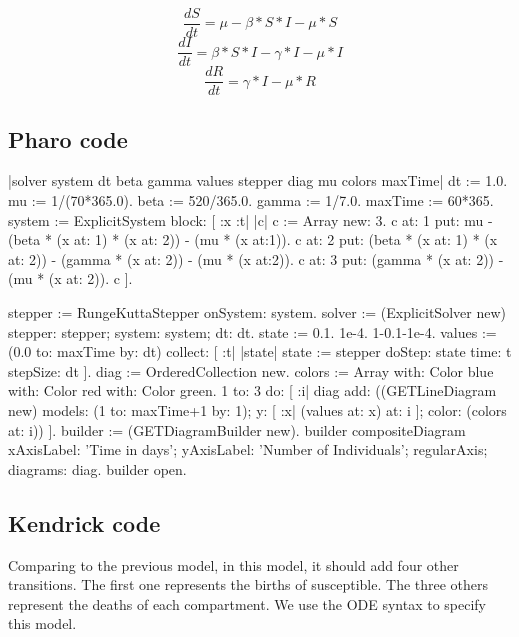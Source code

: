 \documentclass[a4paper,10pt,twoside]{book}
\begin{document}
\begin{equation}
\frac{dS}{dt} = \mu-\beta*S*I-\mu*S
\end{equation}
\begin{equation}
\frac{dI}{dt} = \beta*S*I-\gamma*I-\mu*I
\end{equation}
\begin{equation}
\frac{dR}{dt} = \gamma*I-\mu*R
\end{equation}
\subsection{ Pharo code}

\begin{code}{}
|solver system dt beta gamma values stepper diag mu colors maxTime|
dt := 1.0.
mu := 1/(70*365.0).
beta := 520/365.0.
gamma := 1/7.0.
maxTime := 60*365.
system := ExplicitSystem block: [ :x :t| |c|
     c := Array new: 3.
     c at: 1 put: mu - (beta  * (x at: 1) * (x at: 2)) - (mu * (x at:1)).
     c at: 2 put: (beta * (x at: 1) * (x at: 2)) - (gamma * (x at: 2)) - (mu * (x at:2)).
     c at: 3 put: (gamma * (x at: 2)) - (mu * (x at: 2)).
     c
     ].

stepper := RungeKuttaStepper onSystem: system.
solver := (ExplicitSolver new) stepper: stepper; system: system; dt: dt.
state := { 0.1. 1e-4. 1-0.1-1e-4}.
values := (0.0 to: maxTime by: dt) collect: [ :t| |state| state := stepper doStep: state
                                                          time: t stepSize: dt ].
diag := OrderedCollection new.
colors := Array with: Color blue with: Color red with: Color green.
1 to: 3 do: [ :i|
    diag add:
        ((GETLineDiagram new)
            models: (1 to: maxTime+1 by: 1);
            y: [ :x| (values at: x) at: i ];
            color: (colors at: i))
     ].
builder := (GETDiagramBuilder new).
builder compositeDiagram
    xAxisLabel: 'Time in days';
    yAxisLabel: 'Number of Individuals';
    regularAxis;
    diagrams: diag.
builder open.
\end{code}

\subsection{Kendrick code}
Comparing to the previous model, in this model, it should add four other transitions. The first one represents the births of susceptible.
The three others represent the deaths of each compartment.
We use the ODE syntax to specify this model.
\end{document}
